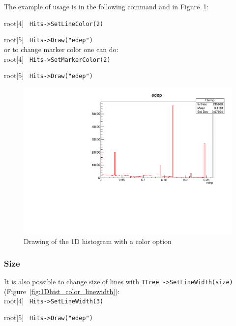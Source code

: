 \documentclass[12pt]{article}
\begin{document}
The example of usage is in the following command and in Figure~\ref{fig:1Dhist_color}:

root[4] \verb| Hits->SetLineColor(2) |

root[5] \verb| Hits->Draw("edep") | \\

or to change marker color one can do:\\

root[4] \verb| Hits->SetMarkerColor(2) |

root[5] \verb| Hits->Draw("edep") | \\
\begin{figure}[h]
\centering
\includegraphics[scale=0.5]{figs/1Dhist_color.pdf}
\caption{Drawing of the 1D histogram with a color option}
\label{fig:1Dhist_color}
\end{figure}

\subsubsection{Size}
It is also possible to change size of lines with \verb|TTree ->SetLineWidth(size)| (Figure~\ref{fig:1Dhist_color_linewidth}): \\

root[4] \verb| Hits->SetLineWidth(3) |

root[5] \verb| Hits->Draw("edep") | \\
\end{document}
